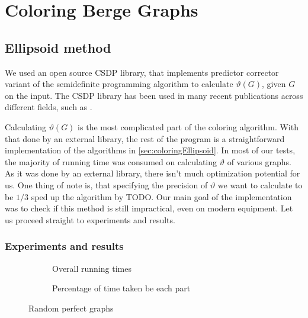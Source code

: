\pagebreak
\section{Coloring Berge Graphs}

\subsection{Ellipsoid method}

We used an open source CSDP \cite{csdpRepo, csdp1999} library, that implements predictor corrector variant of the semidefinite programming algorithm to calculate $\vartheta(G)$, given $G$ on the input. The CSDP library has been used in many recent publications across different fields, such as \cite{Ampountolas_2017, Adasme_2011}.


Calculating $\vartheta(G)$ is the most complicated part of the coloring algorithm. With that done by an external library, the rest of the program is a straightforward implementation of the algorithms in \cref{sec:coloringEllipsoid}. In most of our tests, the majority of running time was consumed on calculating $\vartheta$ of various graphs. As it was done by an external library, there isn't much optimization potential for us. One thing of note is, that specifying the precision of $\vartheta$ we want to calculate to be $1/3$ sped up the algorithm by TODO. Our main goal of the implementation was to check if this method is still impractical, even on modern equipment. Let us proceed straight to experiments and results.

\subsubsection{Experiments and results}

\begin{figure}
  \begin{subfigure}{.5\textwidth}
    \centering
    
    \caption{Overall running times}
  \end{subfigure}%
  \begin{subfigure}{.5\textwidth}
    \centering
    
    \caption{Percentage of time taken be each part}
  \end{subfigure}
  \caption{Random perfect graphs}
\end{figure}

